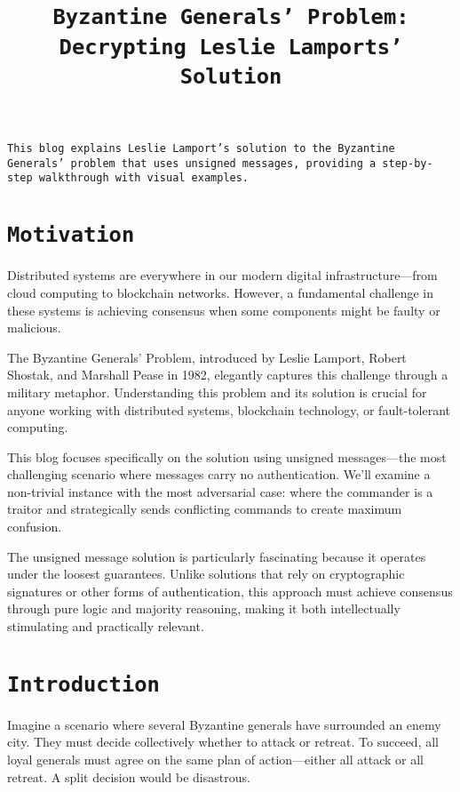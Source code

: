 \documentclass[11pt]{article}
\title{\texttt{\LARGE Byzantine Generals' Problem: \\[0.3em] \Large Decrypting Leslie Lamports' Solution}}
\date{}
\begin{document}
\maketitle

\begin{center}
\begin{minipage}{0.85\textwidth}
\texttt{\large This blog explains Leslie Lamport's solution to the Byzantine Generals' problem that uses unsigned messages, providing a step-by-step walkthrough with visual examples.}
\end{minipage}
\end{center}
\vspace{1em}

\section*{\texttt{\Large Motivation}}
\justifying
Distributed systems are everywhere in our modern digital infrastructure—from cloud computing to blockchain networks. However, a fundamental challenge in these systems is achieving consensus when some components might be faulty or malicious.

The Byzantine Generals' Problem, introduced by Leslie Lamport, Robert Shostak, and Marshall Pease in 1982, elegantly captures this challenge through a military metaphor. Understanding this problem and its solution is crucial for anyone working with distributed systems, blockchain technology, or fault-tolerant computing.

This blog focuses specifically on the solution using unsigned messages—the most challenging scenario where messages carry no authentication. We'll examine a non-trivial instance with the most adversarial case: where the commander is a traitor and strategically sends conflicting commands to create maximum confusion.

The unsigned message solution is particularly fascinating because it operates under the loosest guarantees. Unlike solutions that rely on cryptographic signatures or other forms of authentication, this approach must achieve consensus through pure logic and majority reasoning, making it both intellectually stimulating and practically relevant.
\section*{\texttt{\Large Introduction}}
\justifying
Imagine a scenario where several Byzantine generals have surrounded an enemy city. They must decide collectively whether to attack or retreat. To succeed, all loyal generals must agree on the same plan of action—either all attack or all retreat. A split decision would be disastrous.
\end{document}
